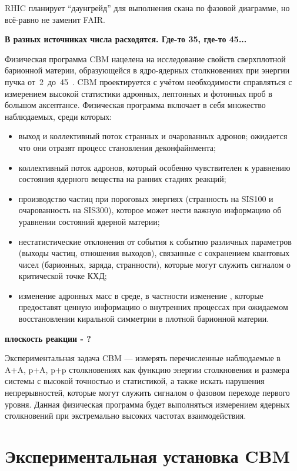 RHIC планирует ``даунгрейд'' для выполнения скана по фазовой диаграмме, но \todo всё-равно не заменит FAIR.



\todo \textbf{В разных источниках числа расходятся. Где-то 35, где-то 45...}

Физическая программа CBM нацелена на исследование свойств сверхплотной барионной материи, образующейся в ядро-ядерных столкновениях при энергии пучка от~2~до~45~\GeVperNucl. CBM проектируется с учётом необходимости справляться с измерением высокой статистики адронных, лептонных и фотонных проб в большом аксептансе. Физическая программа включает в себя множество наблюдаемых, среди которых:

\begin{itemize}
\item выход и коллективный поток странных и очарованных адронов; ожидается что они отразят процесс становления деконфайнмента;
\item коллективный поток адронов, который особенно чувствителен к уравнению состояния ядерного вещества на ранних стадиях реакций;
\item производство частиц при пороговых энергиях (странность на SIS100 и очарованность на SIS300), которое может нести важную информацию об уравнении состояний ядерной материи;
\item нестатистические отклонения от события к событию различных параметров (выходы частиц, отношения выходов), связанные с сохранением квантовых чисел (барионных, заряда, странности), которые могут служить сигналом о критической точке КХД;
\item изменение адронных масс в среде, в частности изменение \todo, которые предоставят ценную информацию о внутренних процессах при ожидаемом восстановлении киральной симметрии в плотной барионной материи.
\end{itemize}

\todo \textbf{плоскость реакции - ?}

Экспериментальная задача CBM --- измерять перечисленные наблюдаемые в A+A, p+A, p+p столкновениях как функцию энергии столкновения и размера системы с высокой точностью и статистикой, а также искать нарушения непрерывностей, которые могут служить сигналом о фазовом переходе первого уровня. Данная физическая программа будет выполняться измерением ядерных столкновений при экстремально высоких частотах взаимодействия.

\section{Экспериментальная установка CBM}\label{sec:secCbmSetup}

